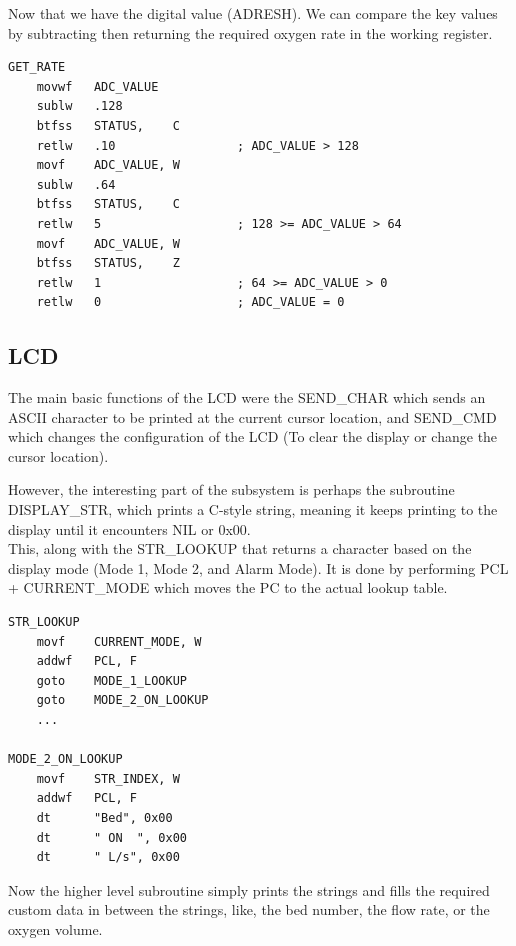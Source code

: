 \documentclass[a4paper, 12pt]{article}
\begin{document}
Now that we have the digital value (ADRESH). We can compare the key values by subtracting then returning the required oxygen rate in the working register.

\begin{lstlisting}
GET_RATE
    movwf	ADC_VALUE
    sublw 	.128
    btfss	STATUS,    C
    retlw	.10            		; ADC_VALUE > 128
    movf	ADC_VALUE, W
    sublw	.64            
    btfss	STATUS,    C
    retlw	5           		; 128 >= ADC_VALUE > 64
    movf	ADC_VALUE, W
    btfss	STATUS,    Z
    retlw	1            		; 64 >= ADC_VALUE > 0
    retlw	0            		; ADC_VALUE = 0
\end{lstlisting}



\subsection{LCD}

\par The main basic functions of the LCD were the SEND\_CHAR which sends an ASCII character to be printed at the current cursor location, and SEND\_CMD which changes the configuration of the LCD (To clear the display or change the cursor location). \\

\par However, the interesting part of the subsystem is perhaps the subroutine DISPLAY\_STR, which prints a C-style string, meaning it keeps printing to the display until it encounters NIL or 0x00. \\

This, along with the STR\_LOOKUP that returns a character based on the display mode (Mode 1, Mode 2, and Alarm Mode). It is done by performing PCL + CURRENT\_MODE which moves the PC to the actual lookup table. \\

\begin{lstlisting}
STR_LOOKUP
    movf	CURRENT_MODE, W
    addwf	PCL, F
    goto	MODE_1_LOOKUP
    goto	MODE_2_ON_LOOKUP
    ...

MODE_2_ON_LOOKUP
    movf	STR_INDEX, W
    addwf	PCL, F
    dt		"Bed", 0x00
    dt		" ON  ", 0x00
    dt		" L/s", 0x00
\end{lstlisting}

Now the higher level subroutine simply prints the strings and fills the required custom data in between the strings, like, the bed number, the flow rate, or the oxygen volume. \\
\end{document}
